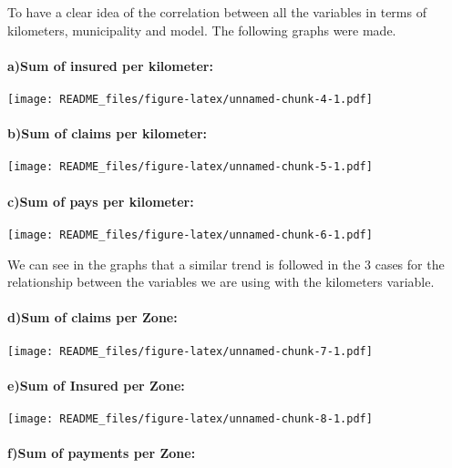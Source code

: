 \documentclass[
]{article}
\begin{document}
To have a clear idea of the correlation between all the variables in
terms of kilometers, municipality and model. The following graphs were
made.

\hypertarget{asum-of-insured-per-kilometer}{%
\paragraph{a)Sum of insured per
kilometer:}\label{asum-of-insured-per-kilometer}}

\texttt{[image: README\_files/figure-latex/unnamed-chunk-4-1.pdf]}

\hypertarget{bsum-of-claims-per-kilometer}{%
\paragraph{b)Sum of claims per
kilometer:}\label{bsum-of-claims-per-kilometer}}

\texttt{[image: README\_files/figure-latex/unnamed-chunk-5-1.pdf]}

\hypertarget{csum-of-pays-per-kilometer}{%
\paragraph{c)Sum of pays per
kilometer:}\label{csum-of-pays-per-kilometer}}

\texttt{[image: README\_files/figure-latex/unnamed-chunk-6-1.pdf]}

We can see in the graphs that a similar trend is followed in the 3 cases
for the relationship between the variables we are using with the
kilometers variable.

\hypertarget{dsum-of-claims-per-zone}{%
\paragraph{d)Sum of claims per Zone:}\label{dsum-of-claims-per-zone}}

\texttt{[image: README\_files/figure-latex/unnamed-chunk-7-1.pdf]}

\hypertarget{esum-of-insured-per-zone}{%
\paragraph{e)Sum of Insured per Zone:}\label{esum-of-insured-per-zone}}

\texttt{[image: README\_files/figure-latex/unnamed-chunk-8-1.pdf]}

\hypertarget{fsum-of-payments-per-zone}{%
\paragraph{f)Sum of payments per
Zone:}\label{fsum-of-payments-per-zone}}
\end{document}
